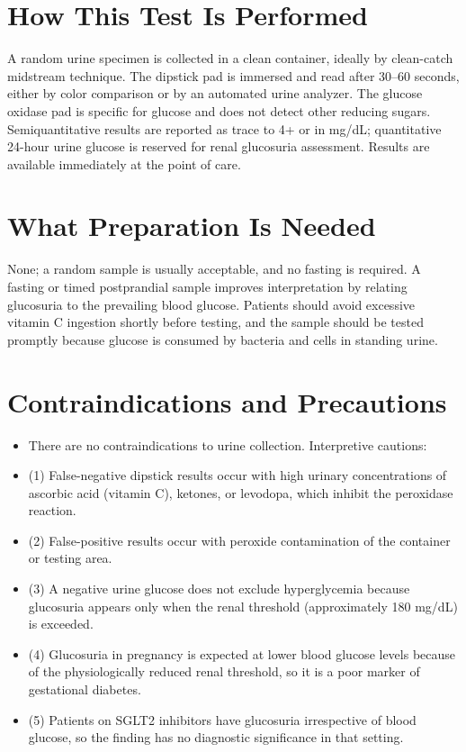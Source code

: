 \section*{How This Test Is Performed}
A random urine specimen is collected in a clean container, ideally by clean-catch midstream technique. The dipstick pad is immersed and read after 30--60 seconds, either by color comparison or by an automated urine analyzer. The glucose oxidase pad is specific for glucose and does not detect other reducing sugars. Semiquantitative results are reported as trace to 4+ or in mg/dL; quantitative 24-hour urine glucose is reserved for renal glucosuria assessment. Results are available immediately at the point of care.
\section*{What Preparation Is Needed}
None; a random sample is usually acceptable, and no fasting is required. A fasting or timed postprandial sample improves interpretation by relating glucosuria to the prevailing blood glucose. Patients should avoid excessive vitamin C ingestion shortly before testing, and the sample should be tested promptly because glucose is consumed by bacteria and cells in standing urine.
\section*{Contraindications and Precautions}
\begin{itemize}
  \item There are no contraindications to urine collection. Interpretive cautions:
  \item (1) False-negative dipstick results occur with high urinary concentrations of ascorbic acid (vitamin C), ketones, or levodopa, which inhibit the peroxidase reaction.
  \item (2) False-positive results occur with peroxide contamination of the container or testing area.
  \item (3) A negative urine glucose does not exclude hyperglycemia because glucosuria appears only when the renal threshold (approximately 180 mg/dL) is exceeded.
  \item (4) Glucosuria in pregnancy is expected at lower blood glucose levels because of the physiologically reduced renal threshold, so it is a poor marker of gestational diabetes.
  \item (5) Patients on SGLT2 inhibitors have glucosuria irrespective of blood glucose, so the finding has no diagnostic significance in that setting.
\end{itemize}
